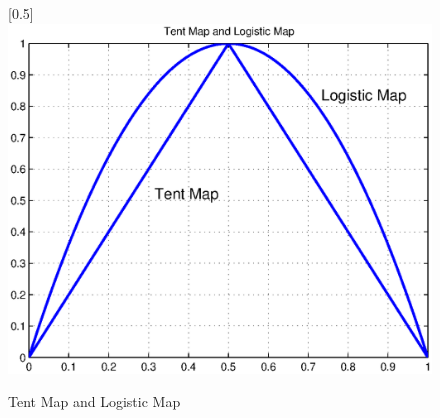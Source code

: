 \documentclass{article}
\begin{document}
\begin{figure}
\caption{\label{tentmapandlogisticmap} Tent Map and Logistic Map }
\centerline{\scalebox{0.5}[0.5]{\includegraphics{tentmapandlogisticmap.eps}}}
\end{figure}
\end{document}
